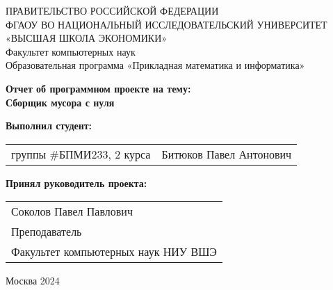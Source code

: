 \begin{titlepage}
    \newpage
    
    {
    \begin{center}
    ПРАВИТЕЛЬСТВО РОССИЙСКОЙ ФЕДЕРАЦИИ\\
    ФГАОУ ВО НАЦИОНАЛЬНЫЙ ИССЛЕДОВАТЕЛЬСКИЙ УНИВЕРСИТЕТ\\
    «ВЫСШАЯ ШКОЛА ЭКОНОМИКИ»
    \\
    \bigskip
    Факультет компьютерных наук\\
    Образовательная программа «Прикладная математика и информатика»
    \end{center}
    }
    
    \vspace{2em}
    \vspace{4em}
    
    \begin{center}
    {\bf Отчет об программном проекте на тему:}\\
    {\bf Сборщик мусора с нуля}\\
    \end{center}
    
    \vspace{2em}
    
    {\bf Выполнил студент: \vspace{2mm}}
    
    {
    \begin{tabular}{l@{\hskip 1.5cm}l}
    группы \#БПМИ233, 2 курса & Битюков Павел Антонович \\
    \end{tabular}} 
    
    \vspace{1em}
    {\bf Принял руководитель проекта: \vspace{2mm}}
    
    {
    \begin{tabular}{l}
    Соколов Павел Павлович\\
    Преподаватель\\
    Факультет компьютерных наук НИУ ВШЭ 
    \end{tabular}}
    
    \vspace{\fill}
    
    \begin{center}
    Москва 2024
    \end{center}
    
    \end{titlepage}